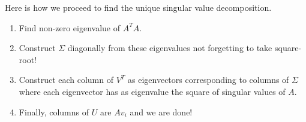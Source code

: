 \documentclass[titlepage]{article}
\numberwithin{equation}{subsection}
\begin{document}
\begin{remark}
Here is how we proceed to find the unique singular value decomposition.

\begin{enumerate}
    \item Find non-zero eigenvalue of $A^{T}A$.
    \item Construct $\Sigma$ diagonally from these eigenvalues not forgetting to take square-root!
    \item Construct each column of $V^{T}$ as eigenvectors corresponding to columns of $\Sigma$ where each eigenvector has as eigenvalue the square of singular values of $A$.
    \item Finally, columns of $U$ are $Av_{i}$ and we are done!
\end{enumerate}
\end{remark}
\end{document}
